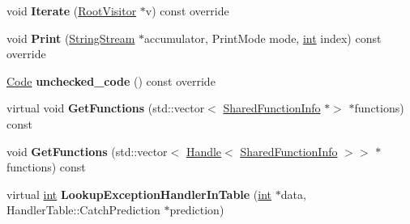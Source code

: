 \begin{DoxyCompactItemize}
void {\bfseries Iterate} (\mbox{\hyperlink{classv8_1_1internal_1_1RootVisitor}{Root\+Visitor}} $\ast$v) const override
\item 
\mbox{\label{classv8_1_1internal_1_1JavaScriptFrame_a2eedcbe1491ac1dec887dbee63bc50f5}} 
void {\bfseries Print} (\mbox{\hyperlink{classv8_1_1internal_1_1StringStream}{String\+Stream}} $\ast$accumulator, Print\+Mode mode, \mbox{\hyperlink{classint}{int}} index) const override
\item 
\mbox{\label{classv8_1_1internal_1_1JavaScriptFrame_a3bdcd25723269875bc5bfe3b3c910b19}} 
\mbox{\hyperlink{classv8_1_1internal_1_1Code}{Code}} {\bfseries unchecked\+\_\+code} () const override
\item 
\mbox{\label{classv8_1_1internal_1_1JavaScriptFrame_acdfeef19598f359117cd354d8e3d3d33}} 
virtual void {\bfseries Get\+Functions} (std\+::vector$<$ \mbox{\hyperlink{classv8_1_1internal_1_1SharedFunctionInfo}{Shared\+Function\+Info}} $\ast$$>$ $\ast$functions) const
\item 
\mbox{\label{classv8_1_1internal_1_1JavaScriptFrame_a176ca9b657756e46944504efa9054dba}} 
void {\bfseries Get\+Functions} (std\+::vector$<$ \mbox{\hyperlink{classv8_1_1internal_1_1Handle}{Handle}}$<$ \mbox{\hyperlink{classv8_1_1internal_1_1SharedFunctionInfo}{Shared\+Function\+Info}} $>$$>$ $\ast$functions) const
\item 
\mbox{\label{classv8_1_1internal_1_1JavaScriptFrame_ac4cbe476e95a9f4704e464f30406e23d}} 
virtual \mbox{\hyperlink{classint}{int}} {\bfseries Lookup\+Exception\+Handler\+In\+Table} (\mbox{\hyperlink{classint}{int}} $\ast$data, Handler\+Table\+::\+Catch\+Prediction $\ast$prediction)
\end{DoxyCompactItemize}
